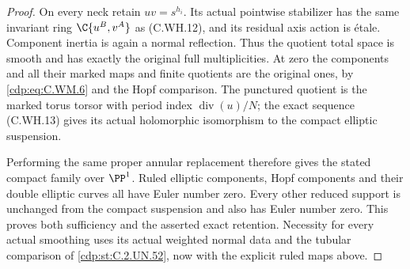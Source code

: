 \begin{proof}
On every neck retain $uv=s^{h_i}$.
Its actual pointwise stabilizer
has the same invariant ring
$\C\{u^B,v^A\}$ as (C.WH.12),
and its residual axis action is
\'{e}tale. Component inertia is
again a normal reflection.
Thus the quotient total space is
smooth and has exactly the
original full multiplicities.
At zero the components and all
their marked maps and finite
quotients are the original ones,
by \eqref{cdp:eq:C.WM.6} and the Hopf comparison.
The punctured quotient is the
marked torus torsor with period
index $\operatorname{div}(u)/N$;
the exact sequence (C.WH.13)
gives its actual holomorphic
isomorphism to the compact
elliptic suspension.

Performing the same proper
annular replacement therefore
gives the stated compact family
over $\PP^1$. Ruled elliptic
components, Hopf components and
their double elliptic curves all
have Euler number zero. Every
other reduced support is unchanged
from the compact suspension and
also has Euler number zero.
This proves both sufficiency and
the asserted exact retention.
Necessity for every actual
smoothing uses its actual weighted
normal data and the tubular
comparison of \ref{cdp:st:C.2.UN.52}, now with
the explicit ruled maps above.
\end{proof}


